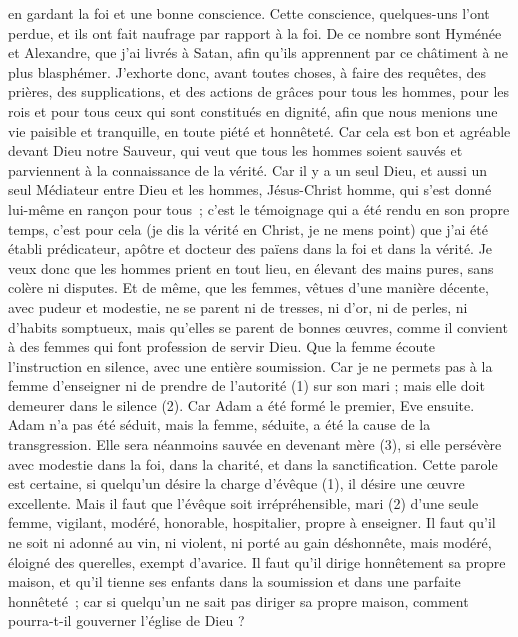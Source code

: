 \begin{multicols}{2}
en gardant la foi et une bonne conscience. Cette conscience, quelques-uns l’ont perdue, et ils ont fait naufrage par rapport à la foi.
De ce nombre sont Hyménée et Alexandre, que j'ai livrés à Satan, afin qu'ils apprennent par ce châtiment à ne plus blasphémer.
\VerseOne{}J'exhorte donc, avant toutes choses, à faire des requêtes, des prières, des supplications, et des actions de grâces pour tous les hommes,
pour les rois et pour tous ceux qui sont constitués en dignité, afin que nous menions une vie paisible et tranquille, en toute piété et honnêteté.
Car cela est bon et agréable devant Dieu notre Sauveur,
qui veut que tous les hommes soient sauvés et parviennent à la connaissance de la vérité.
Car il y a un seul Dieu, et aussi un seul Médiateur entre Dieu et les hommes, Jésus-Christ homme,
qui s'est donné lui-même en rançon pour tous ; c’est le témoignage qui a été rendu en son propre temps,
c'est pour cela (je dis la vérité en Christ, je ne mens point) que j'ai été établi prédicateur, apôtre et docteur des païens dans la foi et dans la vérité.
Je veux donc que les hommes prient en tout lieu, en élevant des mains pures, sans colère ni disputes.
Et de même, que les femmes, vêtues d’une manière décente, avec pudeur et modestie, ne se parent ni de tresses, ni d’or, ni de perles, ni d’habits somptueux,
mais qu'elles se parent de bonnes œuvres, comme il convient à des femmes qui font profession de servir Dieu.
Que la femme écoute l’instruction en silence, avec une entière soumission.
Car je ne permets pas à la femme d'enseigner ni de prendre de l’autorité (1) sur son mari ; mais elle doit demeurer dans le silence (2).
Car Adam a été formé le premier, Eve ensuite.
Adam n’a pas été séduit, mais la femme, séduite, a été la cause de la transgression.
Elle sera néanmoins sauvée en devenant mère (3), si elle persévère avec modestie dans la foi, dans la charité, et dans la sanctification.
\VerseOne{}Cette parole est certaine, si quelqu'un désire la charge d’évêque (1), il désire une œuvre excellente.
Mais il faut que l'évêque soit irrépréhensible, mari (2) d'une seule femme, vigilant, modéré, honorable, hospitalier, propre à enseigner.
Il faut qu’il ne soit ni adonné au vin, ni violent, ni porté au gain déshonnête, mais modéré, éloigné des querelles, exempt d’avarice.
Il faut qu’il dirige honnêtement sa propre maison, et qu’il tienne ses enfants dans la soumission et dans une parfaite honnêteté ;
car si quelqu'un ne sait pas diriger sa propre maison, comment pourra-t-il gouverner l'église de Dieu ?

\end{multicols}
